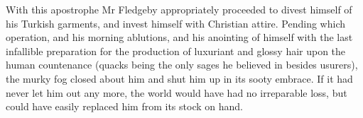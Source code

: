 With this apostrophe Mr Fledgeby appropriately proceeded to divest
himself of his Turkish garments, and invest himself with Christian
attire. Pending which operation, and his morning ablutions, and his
anointing of himself with the last infallible preparation for the
production of luxuriant and glossy hair upon the human countenance
(quacks being the only sages he believed in besides usurers), the murky
fog closed about him and shut him up in its sooty embrace. If it had
never let him out any more, the world would have had no irreparable
loss, but could have easily replaced him from its stock on hand.



